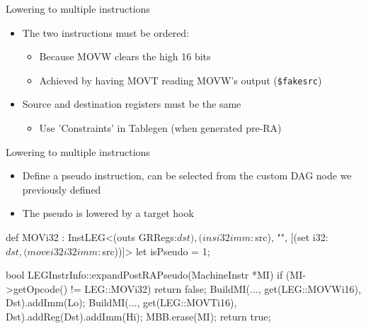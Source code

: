 
\begin{frame}[fragile]{Lowering to multiple instructions}

\begin{itemize}
    \item The two instructions must be ordered:
    \begin{itemize}
        \item Because MOVW clears the high 16 bits
        \item Achieved by having MOVT reading MOVW's output (\texttt{\$fakesrc})
    \end{itemize}
    \item Source and destination registers must be the same
    \begin{itemize}
        \item Use 'Constraints' in Tablegen (when generated pre-RA)
    \end{itemize}
\end{itemize}


\end{frame}


\begin{frame}[fragile]{Lowering to multiple instructions}

\begin{itemize}
    \item Define a pseudo instruction, can be selected from the custom DAG node we previously defined
    \item The pseudo is lowered by a target hook
\end{itemize}

\begin{codebox}
def MOVi32 : InstLEG<(outs GRRegs:$dst), (ins i32imm:$src), "",
                     [(set i32:$dst, (movei32 i32imm:$src))]> {
  let isPseudo = 1;
}
\end{codebox}

\begin{codebox}
bool LEGInstrInfo::expandPostRAPseudo(MachineInstr *MI) {
   if (MI->getOpcode() != LEG::MOVi32) return false;
   BuildMI(..., get(LEG::MOVWi16), Dst).addImm(Lo);
   BuildMI(..., get(LEG::MOVTi16), Dst).addReg(Dst).addImm(Hi);
   MBB.erase(MI);
   return true;
}
\end{codebox}

\end{frame}

